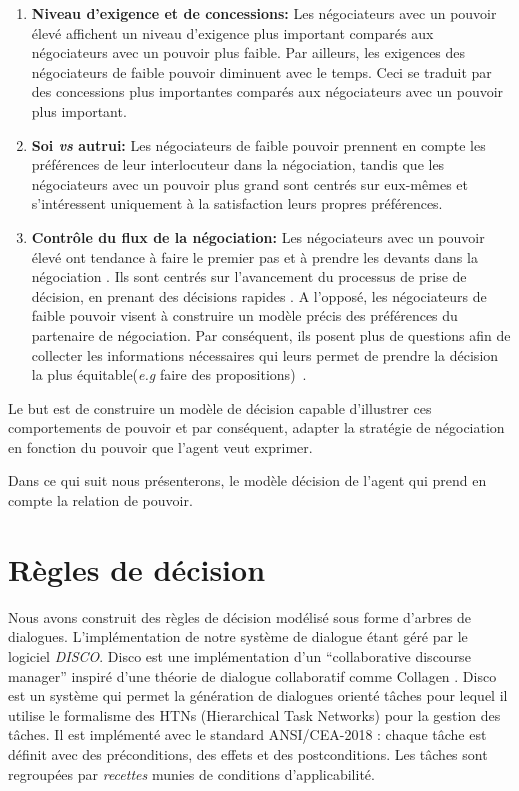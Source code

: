 	\begin{enumerate}
	\item \textbf{Niveau d'exigence et de concessions:} Les négociateurs avec un pouvoir élevé affichent un niveau d'exigence plus important comparés aux négociateurs avec un pouvoir plus faible. Par ailleurs, les exigences des négociateurs de faible pouvoir diminuent avec le temps. Ceci se traduit par des concessions plus importantes comparés aux négociateurs avec un pouvoir plus important. \cite{de1995impact}
	
	\item \textbf{Soi \emph{vs} autrui:} Les négociateurs de faible pouvoir prennent en compte les préférences de leur interlocuteur dans la négociation, tandis que les négociateurs avec un pouvoir plus grand sont  centrés sur eux-mêmes et s'intéressent uniquement à la satisfaction leurs propres préférences. \cite{fiske1993controlling,de1995impact}
	
	\item \textbf{Contrôle du flux de la négociation:}
	Les négociateurs avec un pouvoir élevé ont tendance à faire le premier pas et à prendre les devants dans la négociation \cite {magee2007power}. Ils sont centrés sur l'avancement du processus de prise de décision, en prenant des décisions rapides \cite{zablotskaya2012relating}.
	  A l'opposé, les négociateurs de faible pouvoir visent à construire un modèle précis des préférences du partenaire de négociation. 
	  Par conséquent,  ils posent plus de questions afin de collecter les informations nécessaires qui leurs permet de prendre la décision la plus équitable(\emph{e.g}  faire des propositions)~\cite{de2004influence}. 
	
\end{enumerate}


Le but est de construire un modèle de décision capable d'illustrer ces comportements de pouvoir et par conséquent, adapter la stratégie de négociation en fonction du pouvoir que l'agent veut exprimer.

Dans ce qui suit nous présenterons, le modèle décision de l'agent qui prend en compte la relation de pouvoir.

 
\section{Règles de décision}
	Nous avons construit des règles de décision modélisé sous forme d'arbres de dialogues. L'implémentation de notre système de dialogue étant géré par le logiciel \emph{DISCO}. Disco est une implémentation d'un ``collaborative discourse manager'' inspiré d'une théorie de dialogue collaboratif comme Collagen \cite{rich1997collagen}. Disco est un système qui permet la génération de dialogues orienté tâches pour lequel il utilise le formalisme des HTNs (Hierarchical Task Networks) \cite{erol1994htn} pour la gestion des tâches. Il est implémenté avec le standard ANSI/CEA-2018 : chaque tâche est définit avec des préconditions, des effets et des postconditions. Les tâches sont regroupées par \emph{recettes} munies de conditions d'applicabilité.
	
